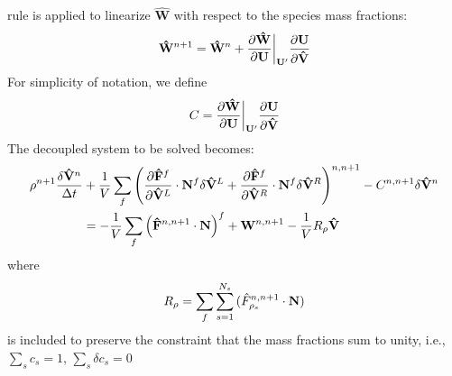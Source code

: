 rule is applied to linearize $\mathbf{\hat{W}}$ with respect to the species mass
fractions:
\begin{equation} 
  \mathbf{\hat{W}}^{n+1} = \mathbf{\hat{W}}^n + 
  \frac{\partial \mathbf{\hat{W}}}{\partial \mathbf U} \bigg|_{\mathbf U '} 
  \frac{\partial \mathbf U}{\partial \mathbf{\hat{V}}}
  \label{source-term-linearization}
\end{equation}
For simplicity of notation, we define
\begin{equation} 
  C = \frac{\partial \mathbf{\hat{W}}}{\partial \mathbf U} \bigg|_{\mathbf{U}'} \frac{\partial \mathbf U}{\partial \mathbf{\hat{V}}}
  \label{c-source-term}
\end{equation}
The decoupled system to be solved becomes:
\begin{equation} 
  \begin{split}
    \rho^{n+1} \frac{\delta \mathbf{\hat{V}}^n}{\Delta t} &+ \frac{1}{V} 
    \sum\limits_{f}^{}{ \left( \frac{\partial \mathbf{\hat{F}}^f}{\partial \mathbf{\hat{V}}^L} \cdot \mathbf{N}^f \delta \mathbf{\hat{V}}^L 
    + \frac{\partial \mathbf{\hat{F}}^f}{\partial \mathbf{\hat{V}}^R} \cdot \mathbf{N}^f \delta \mathbf{\hat{V}}^R \right)^{n,n+1}} 
    - C^{n,n+1} \delta \mathbf{\hat{V}}^n \\ 
    &= -\frac{1}{V}\sum\limits_{f}^{}{
      \left( \mathbf{\hat{F}}^{n,n+1} \cdot \mathbf{N} \right)^f } 
      + \mathbf{W}^{n, n+1} - \frac{1}{V} R_\rho \mathbf{\hat{V}}
  \end{split}
\end{equation}
where
\begin{equation}
  R_\rho =
  \sum\limits_{f}^{}{\sum\limits_{s=1}^{N_s}{(\hat{F}_{\rho_s}^{n,n+1}\cdot\mathbf{N})}} 
  \label{decoupled-no-scaling}
\end{equation}
is included to preserve the constraint that the mass fractions
sum to unity, i.e., $\sum\limits_{s}{c_s}=1$, $\sum\limits_{s}{\delta c_s}=0$

